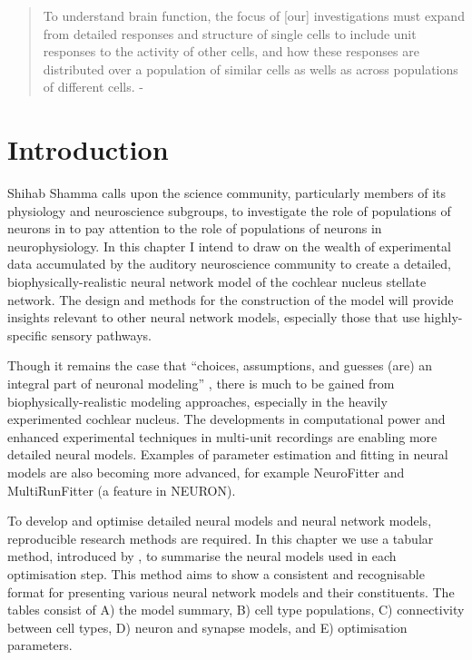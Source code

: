  

\begin{quotation}
  To understand brain function, the focus of [our] investigations must
  expand from detailed responses and structure of single cells to
  include unit responses to the activity of other cells, and how these
  responses are distributed over a population of similar cells as
  wells as across populations of different cells.  - \emph{\citet{Shamma:1998}}
\end{quotation}




\section{Introduction}

Shihab Shamma calls upon the science community, particularly members
of its physiology and neuroscience subgroups, to investigate the role
of populations of neurons in to pay attention to the role of
populations of neurons in neurophysiology. In this chapter I intend to
draw on the wealth of experimental data accumulated by the auditory
neuroscience community to create a detailed, biophysically-realistic
neural network model of the cochlear nucleus stellate network.  The
design and methods for the construction of the model will provide
insights relevant to other neural network models, especially those
that use highly-specific sensory pathways.

\medskip{}

Though it remains the case that ``choices, assumptions, and guesses
(are) an integral part of neuronal modeling''
\citep{SegevBurkeEtAl:1998}, there is much to be gained from
biophysically-realistic modeling approaches, especially in the heavily
experimented cochlear nucleus. The developments in computational power
and enhanced experimental techniques in multi-unit recordings are
enabling more detailed neural models. Examples of parameter estimation
and fitting in neural models are also becoming more advanced, for
example NeuroFitter\citep{citation} and MultiRunFitter (a feature in
NEURON).  

\medskip{}

  To develop and optimise detailed neural models and
neural network models, reproducible research methods are required. In
this chapter we use a tabular method, introduced by
\citet{NordlieGewaltigEtAl:2009}, to summarise the neural models used in each
optimisation step. This method aims to show a consistent and
recognisable format for presenting various neural network models and
their constituents.  The tables consist of A) the model summary, B)
cell type populations, C) connectivity between cell types, D) neuron
and synapse models, and E) optimisation parameters.

